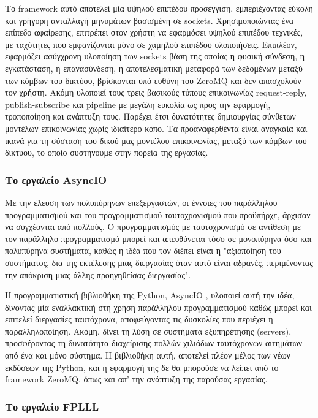 Το framework αυτό αποτελεί μία υψηλού επιπέδου προσέγγιση, εμπεριέχοντας εύκολη και γρήγορη ανταλλαγή μηνυμάτων βασισμένη σε sockets. Χρησιμοποιώντας ένα επίπεδο αφαίρεσης, επιτρέπει στον χρήστη να εφαρμόσει υψηλού επιπέδου τεχνικές, με ταχύτητες που εμφανίζονται μόνο σε χαμηλού επιπέδου υλοποιήσεις. Επιπλέον, εφαρμόζει ασύγχρονη υλοποίηση των sockets βάση της οποίας η φυσική σύνδεση, η εγκατάσταση, η επανασύνδεση, η αποτελεσματική μεταφορά των δεδομένων μεταξύ των κόμβων του δικτύου, βρίσκονται υπό ευθύνη του ZeroMQ και  δεν απασχολούν τον χρήστη. Ακόμη υλοποιεί τους τρεις βασικούς τύπους επικοινωνίας request-reply, publish-subscribe και pipeline με μεγάλη ευκολία ως προς την εφαρμογή, τροποποίηση και ανάπτυξη τους. Παρέχει έτσι δυνατότητες δημιουργίας σύνθετων μοντέλων επικοινωνίας χωρίς ιδιαίτερο κόπο. Τα προαναφερθέντα είναι αναγκαία και ικανά για τη σύσταση του δικού μας μοντέλου επικοινωνίας, μεταξύ των κόμβων του δικτύου, το οποίο συστήνουμε στην πορεία της εργασίας. 

\subsubsection{Το εργαλείο \lt AsyncIO}

Με την έλευση των πολυπύρηνων επεξεργαστών, οι έννοιες του παράλληλου προγραμματισμού και του προγραμματισμού ταυτοχρονισμού που προϋπήρχε, άρχισαν να συγχέονται από πολλούς. Ο προγραμματισμός με ταυτοχρονισμό \cite{ConcurentDist} σε αντίθεση με τον παράλληλο προγραμματισμό μπορεί και απευθύνεται τόσο σε μονοπύρηνα όσο και πολυπύρηνα συστήματα, καθώς η ιδέα που τον διέπει είναι η "αξιοποίηση του συστήματος, δια της εκτέλεσης μιας διεργασίας όταν αυτό είναι αδρανές, περιμένοντας την απόκριση μιας άλλης προηγηθείσας διεργασίας".  

Η προγραμματιστική βιβλιοθήκη της Python, AsyncIO \cite{asyncIO}\cite{uAsync}, υλοποιεί αυτή την ιδέα, δίνοντας μία εναλλακτική στη χρήση παράλληλου προγραμματισμού καθώς μπορεί και επιτελεί διεργασίες ταυτόχρονα, αποφεύγοντας τις δυσκολίες που περιέχει η παραλληλοποίηση. Ακόμη, δίνει τη λύση σε συστήματα εξυπηρέτησης (servers), προσφέροντας τη δυνατότητα διαχείρισης πολλών χιλιάδων ταυτόχρονων αιτημάτων από ένα και μόνο σύστημα. Η βιβλιοθήκη αυτή, αποτελεί πλέον μέλος των νέων εκδόσεων της Python, και η εφαρμογή της δε θα μπορούσε να λείπει από το framework ZeroMQ, όπως και απ' την ανάπτυξη της παρούσας εργασίας. 

\subsubsection{Το εργαλείο \lt FPLLL}


